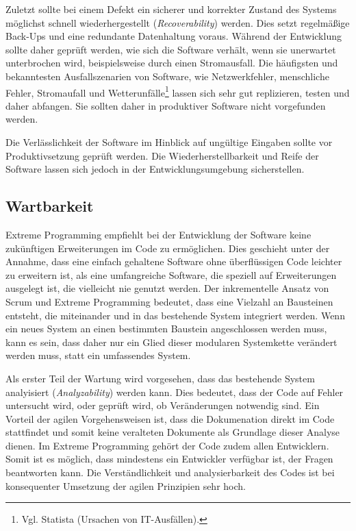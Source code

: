             Zuletzt sollte bei einem Defekt ein sicherer und korrekter Zustand des Systems möglichst schnell wiederhergestellt (\emph{Recoverability}) werden. Dies setzt regelmäßige Back-Ups und eine redundante Datenhaltung voraus. Während der Entwicklung sollte daher geprüft werden, wie sich die Software verhält, wenn sie unerwartet unterbrochen wird, beispielsweise durch einen Stromausfall. Die häufigsten und bekanntesten Ausfallszenarien von Software, wie Netzwerkfehler, menschliche Fehler, Stromaufall und Wetterunfälle\footnote{Vgl. Statista (Ursachen von IT-Ausfällen).} lassen sich sehr gut replizieren, testen und daher abfangen. Sie sollten daher in produktiver Software nicht vorgefunden werden.

            Die Verlässlichkeit der Software im Hinblick auf ungültige Eingaben sollte vor Produktivsetzung geprüft werden. Die Wiederherstellbarkeit und Reife der Software lassen sich jedoch in der Entwicklungsumgebung sicherstellen.

        \subsection{Wartbarkeit}

            Extreme Programming empfiehlt bei der Entwicklung der Software keine zukünftigen Erweiterungen im Code zu ermöglichen. Dies geschieht unter der Annahme, dass eine einfach gehaltene Software ohne überflüssigen Code leichter zu erweitern ist, als eine umfangreiche Software, die speziell auf Erweiterungen ausgelegt ist, die vielleicht nie genutzt werden. Der inkrementelle Ansatz von Scrum und Extreme Programming bedeutet, dass eine Vielzahl an Bausteinen entsteht, die miteinander und in das bestehende System integriert werden. Wenn ein neues System an einen bestimmten Baustein angeschlossen werden muss, kann es sein, dass daher nur ein Glied dieser modularen Systemkette verändert werden muss, statt ein umfassendes System.

            Als erster Teil der Wartung wird vorgesehen, dass das bestehende System analyisiert (\emph{Analyzability}) werden kann. Dies bedeutet, dass der Code auf Fehler untersucht wird, oder geprüft wird, ob Veränderungen notwendig sind. Ein Vorteil der agilen Vorgehensweisen ist, dass die Dokumenation direkt im Code stattfindet und somit keine veralteten Dokumente als Grundlage dieser Analyse dienen. Im Extreme Programming gehört der Code zudem allen Entwicklern. Somit ist es möglich, dass mindestens ein Entwickler verfügbar ist, der Fragen beantworten kann. Die Verständlichkeit und analysierbarkeit des Codes ist bei konsequenter Umsetzung der agilen Prinzipien sehr hoch.

